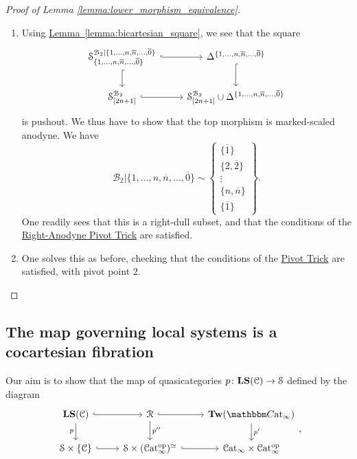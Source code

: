 \documentclass[main.tex]{subfiles}
\begin{document}
\begin{proof}[Proof of Lemma \ref{lemma:lower_morphism_equivalence}]
\begin{enumerate}
    \item Using \hyperref[lemma:bicartesian_square]{Lemma~\ref*{lemma:bicartesian_square}}, we see that the square
      \begin{equation*}
        \begin{tikzcd}
          \S^{\mathcal{B}_{2}|\{1, \ldots, n, \overline{n}, \ldots, \overline{0}\}}_{\{1, \ldots, n, \overline{n}, \ldots, \overline{0}\}}
          \arrow[r, hook]
          \arrow[d, hook]
          & \Delta^{\{1, \ldots, n, \overline{n}, \ldots, \overline{0}\}}
          \arrow[d, hook]
          \\
          \S^{\mathcal{B}_{2}}_{[2n+1]}
          \arrow[r, hook]
          & \S^{\mathcal{B}_{2}}_{[2n+1]} \cup \Delta^{\{1, \ldots, n, \overline{n}, \ldots, \overline{0}\}}
        \end{tikzcd}
      \end{equation*}
      is pushout. We thus have to show that the top morphism is marked-scaled anodyne. We have
      \begin{equation*}
        \mathcal{B}_{2}|\{1, \ldots, n, \overline{n}, \ldots, \overline{0}\} \sim
        \left\{ \substack{ \{\overline{1}\} \\ \{2, \overline{2}\} \\ \vdots \\ \{n, \overline{n}\} \\ \{\overline{1}\} } \right\}.
      \end{equation*}
      One readily sees that this is a right-dull subset, and that the conditions of the \hyperref[lemma:right-anodyne_pivot_trick]{Right-Anodyne Pivot Trick} are satisfied.

    \item One solves this as before, checking that the conditions of the \hyperref[lemma:pivot_trick]{Pivot Trick} are satisfied, with pivot point $2$.
  \end{enumerate}
\end{proof}

\subsection{The map governing local systems is a cocartesian fibration}
\label{ssc:the_fibration}

Our aim is to show that the map of quasicategories $p\colon \mathbf{LS}(\mathcal{C}) \to \mathcal{S}$ defined by the diagram
\begin{equation*}
  \begin{tikzcd}
    \LS(\category{C})
    \arrow[r, hook]
    \arrow[d, swap, "p"]
    & \mathcal{R}
    \arrow[r, hook]
    \arrow[d, "p''"]
    & \Tw(\ICCat)
    \arrow[d, "p'"]
    \\
    \S \times \{\category{C}\}
    \arrow[r, hook]
    & \S \times (\ICat\op)^{\simeq}
    \arrow[r, hook]
    & \ICat \times \ICat\op
  \end{tikzcd},
\end{equation*}
\end{document}
